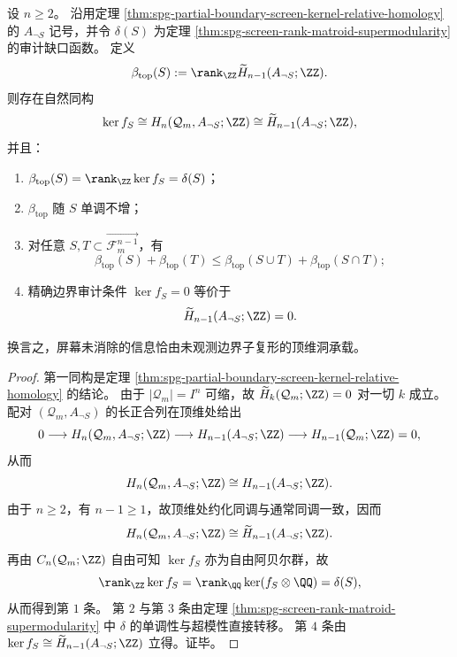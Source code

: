 \begin{theorem}[未观测边界子复形的顶维约化同调刻画屏幕核]\label{thm:spg-screen-kernel-top-homology-supermodular}
设 \(n\ge 2\)。
沿用定理 \ref{thm:spg-partial-boundary-screen-kernel-relative-homology} 的 \(A_{\neg S}\) 记号，并令 \(\delta(S)\) 为定理 \ref{thm:spg-screen-rank-matroid-supermodularity} 的审计缺口函数。
定义
\[
\beta_{\mathrm{top}}(S):=\rank_{\ZZ}\widetilde H_{n-1}(A_{\neg S};\ZZ).
\]
则存在自然同构
\[
\ker f_S\cong H_n(\mathcal Q_m,A_{\neg S};\ZZ)\cong \widetilde H_{n-1}(A_{\neg S};\ZZ),
\]
并且：
\begin{enumerate}
  \item \(\beta_{\mathrm{top}}(S)=\rank_{\ZZ}\ker f_S=\delta(S)\)；
  \item \(\beta_{\mathrm{top}}\) 随 \(S\) 单调不增；
  \item 对任意 \(S,T\subset \overrightarrow{\mathcal F_m^{n-1}}\)，有
        \[
        \beta_{\mathrm{top}}(S)+\beta_{\mathrm{top}}(T)
        \le
        \beta_{\mathrm{top}}(S\cup T)+\beta_{\mathrm{top}}(S\cap T);
        \]
  \item 精确边界审计条件 \(\ker f_S=0\) 等价于
        \[
        \widetilde H_{n-1}(A_{\neg S};\ZZ)=0.
        \]
\end{enumerate}
换言之，屏幕未消除的信息恰由未观测边界子复形的顶维洞承载。
\end{theorem}
\begin{proof}
第一同构是定理 \ref{thm:spg-partial-boundary-screen-kernel-relative-homology} 的结论。
由于 \(|\mathcal Q_m|=I^n\) 可缩，故 \(\widetilde H_k(\mathcal Q_m;\ZZ)=0\) 对一切 \(k\) 成立。
配对 \((\mathcal Q_m,A_{\neg S})\) 的长正合列在顶维处给出
\[
0
\longrightarrow
H_n(\mathcal Q_m,A_{\neg S};\ZZ)
\longrightarrow
H_{n-1}(A_{\neg S};\ZZ)
\longrightarrow
H_{n-1}(\mathcal Q_m;\ZZ)
=0,
\]
从而
\[
H_n(\mathcal Q_m,A_{\neg S};\ZZ)\cong H_{n-1}(A_{\neg S};\ZZ).
\]
由于 \(n\ge 2\)，有 \(n-1\ge 1\)，故顶维处约化同调与通常同调一致，因而
\[
H_n(\mathcal Q_m,A_{\neg S};\ZZ)\cong \widetilde H_{n-1}(A_{\neg S};\ZZ).
\]
再由 \(C_n(\mathcal Q_m;\ZZ)\) 自由可知 \(\ker f_S\) 亦为自由阿贝尔群，故
\[
\rank_{\ZZ}\ker f_S
=
\rank_{\QQ}\ker(f_S\otimes\QQ)
=
\delta(S),
\]
从而得到第 \(1\) 条。
第 \(2\) 与第 \(3\) 条由定理 \ref{thm:spg-screen-rank-matroid-supermodularity} 中 \(\delta\) 的单调性与超模性直接转移。
第 \(4\) 条由 \(\ker f_S\cong \widetilde H_{n-1}(A_{\neg S};\ZZ)\) 立得。证毕。
\end{proof}

